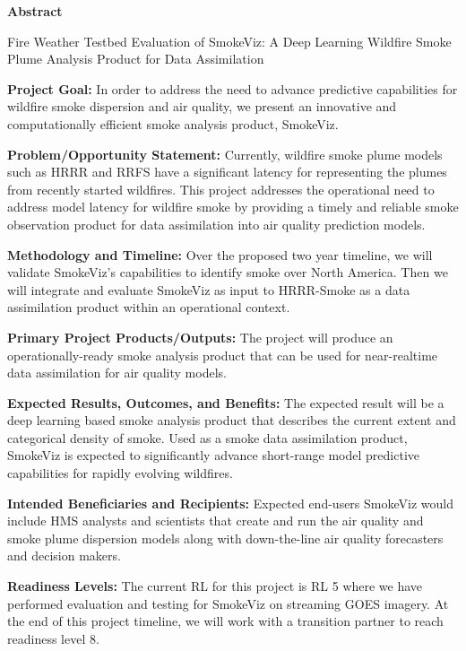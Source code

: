\begin{center}
    \large \textbf{Abstract}\\

    \medskip

    \large Fire Weather Testbed Evaluation of SmokeViz: A Deep Learning Wildfire Smoke Plume Analysis Product for Data Assimilation 
\end{center}

\bigskip

\noindent\textbf{Project Goal:} In order to address the need to advance predictive capabilities for wildfire smoke dispersion and air quality, we present an innovative and computationally efficient smoke analysis product, SmokeViz. 

\bigskip

\noindent\textbf{Problem/Opportunity Statement:} Currently, wildfire smoke plume models such as HRRR and RRFS have a significant latency for representing the plumes from recently started wildfires. This project addresses the operational need to address model latency for wildfire smoke by providing a timely and reliable smoke observation product for data assimilation into air quality prediction models. 

\bigskip

\noindent\textbf{Methodology and Timeline:} Over the proposed two year timeline, we will validate SmokeViz’s capabilities to identify smoke over North America. Then we will integrate and evaluate SmokeViz as input to HRRR-Smoke as a data assimilation product within an operational context.

\bigskip

\noindent\textbf{Primary Project Products/Outputs:} The project will produce an operationally-ready smoke analysis product that can be used for near-realtime data assimilation for air quality models. 

\bigskip

\noindent\textbf{Expected Results, Outcomes, and Benefits:} The expected result will be a deep learning based smoke analysis product that describes the current extent and categorical density of smoke. Used as a smoke data assimilation product, SmokeViz is expected to significantly advance short-range model predictive capabilities for rapidly evolving wildfires.

\bigskip

\noindent\textbf{Intended Beneficiaries and Recipients:} Expected end-users SmokeViz would include HMS analysts and scientists that create and run the air quality and smoke plume dispersion models along with down-the-line air quality forecasters and decision makers.

\bigskip

\noindent\textbf{Readiness Levels:} The current RL for this project is RL 5 where we have performed evaluation and testing for SmokeViz on streaming GOES imagery. At the end of this project timeline, we will work with a transition partner to reach readiness level 8.



